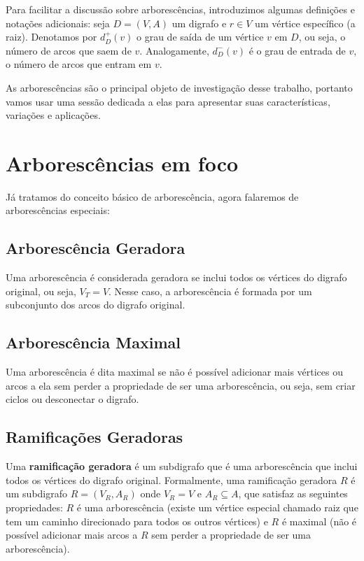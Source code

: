 Para facilitar a discussão sobre arborescências, introduzimos algumas definições e notações adicionais: seja \(D = (V, A)\) um digrafo e \(r \in V\) um vértice específico (a raiz). Denotamos por \(d_D^+(v)\) o grau de saída de um vértice \(v\) em \(D\), ou seja, o número de arcos que saem de \(v\). Analogamente, \(d_D^-(v)\) é o grau de entrada de \(v\), o número de arcos que entram em \(v\).



As arborescências são o principal objeto de investigação desse trabalho, portanto vamos usar uma sessão dedicada a elas para apresentar suas características, variações e aplicações.

\section{Arborescências em foco}


Já tratamos do conceito básico de arborescência, agora falaremos de arborescências especiais:

\subsection{Arborescência Geradora}
Uma arborescência é considerada geradora se inclui todos os vértices do digrafo original, ou seja, \(V_T = V\). Nesse caso, a arborescência é formada por um subconjunto dos arcos do digrafo original.

\subsection{Arborescência Maximal}
Uma arborescência é dita maximal se não é possível adicionar mais vértices ou arcos a ela sem perder a propriedade de ser uma arborescência, ou seja, sem criar ciclos ou desconectar o digrafo.

\subsection{Ramificações Geradoras}
Uma \textbf{ramificação geradora} é um subdigrafo que é uma arborescência que inclui todos os vértices do digrafo original. Formalmente, uma ramificação geradora \(R\) é um subdigrafo \(R = (V_R, A_R)\) onde \(V_R = V\) e \(A_R \subseteq A\), que satisfaz as seguintes propriedades: \(R\) é uma arborescência (existe um vértice especial chamado raiz que tem um caminho direcionado para todos os outros vértices) e \(R\) é maximal (não é possível adicionar mais arcos a \(R\) sem perder a propriedade de ser uma arborescência).


